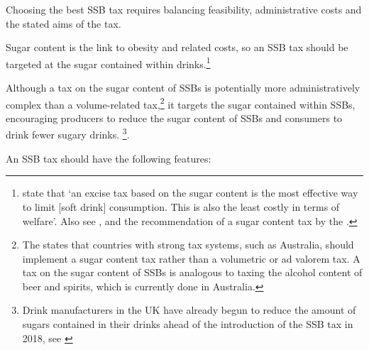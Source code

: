 \documentclass[embargoed]{grattan}
\begin{document}
Choosing the best SSB tax requires balancing feasibility, administrative costs and the stated aims of the tax.

Sugar content is the link to obesity and related costs, so an SSB tax should be targeted at the sugar contained within drinks.\footnote{\textcite{Bonnet2013Taxincidencestrategic} state that `an excise tax based on the sugar content is the most effective way to limit [soft drink] consumption.
This is also the least costly in terms of welfare'.
Also see \textcite{Smith2016SoftDrinksLevy}, \textcite{Organization2016FiscalPoliciesDiet} and the  recommendation of a sugar content tax by the \textcite{SouthAfricaNationalTreasury2016TaxationSugarSweetened}.}

Although a tax on the sugar content of SSBs is potentially more administratively complex than a volume-related tax,\footnote{The \textcite{Organization2016FiscalPoliciesDiet} states that countries with strong tax systems, such as Australia, should implement a sugar content tax rather than a volumetric or ad valorem tax.
A tax on the sugar content of SSBs is analogous to taxing the alcohol content of beer and spirits, which is currently done in Australia.} it targets the sugar contained within SSBs, encouraging producers to reduce the sugar content of SSBs and consumers to drink fewer sugary drinks.%
\footnote{Drink manufacturers in the UK have already begun to reduce the amount of sugars contained in their drinks ahead of the introduction of the SSB tax in 2018, see \textcite{Team2016Sugarlevyworking}}.

An SSB tax should have the following features:
\end{document}
